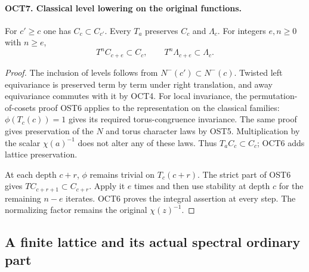 \paragraph{OCT7. Classical level lowering on the original functions.}
\label{claim:OCT7}
For $c'\geq c$ one has $C_c\subset C_{c'}$.  Every $T_a$
preserves $C_c$ and $\Lambda_c$.  For integers $e,n\geq0$
with $n\geq e$,
\begin{equation}\label{eq:oct-lowering}
              T^n C_{c+e}\subset C_c,\qquad
              T^n\Lambda_{c+e}\subset\Lambda_c.
\end{equation}
\begin{proof}
The inclusion of levels follows from
$N^-(c')\subset N^-(c)$.  Twisted left equivariance is
preserved term by term under right translation, and away
equivariance commutes with it by OCT4.  For local invariance,
the permutation-of-cosets proof OST6 applies to the
representation on the classical families: $\phi(T_c(c))=1$
gives its required torus-congruence invariance.  The same
proof gives preservation of the $N$ and torus character laws
by OST5.  Multiplication by the scalar $\chi(a)^{-1}$ does
not alter any of these laws.  Thus $T_aC_c\subset C_c$;
OCT6 adds lattice preservation.

At each depth $c+r$, $\phi$ remains trivial on $T_c(c+r)$.
The strict part of OST6 gives
$T C_{c+r+1}\subset C_{c+r}$.  Apply it $e$ times and then
use stability at depth $c$ for the remaining $n-e$ iterates.
OCT6 proves the integral assertion at every step.  The
normalizing factor remains the original $\chi(z)^{-1}$.
\end{proof}

\subsection{A finite lattice and its actual spectral ordinary part}

